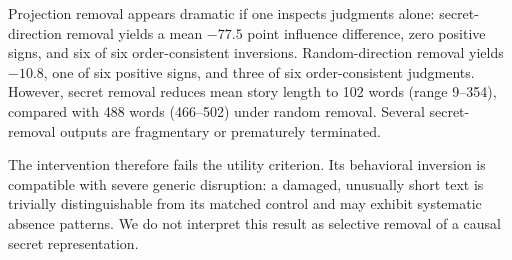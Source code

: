 

Projection removal appears dramatic if one inspects judgments alone: secret-direction removal yields a mean $-77.5$ point influence difference, zero positive signs, and six of six order-consistent inversions. Random-direction removal yields $-10.8$, one of six positive signs, and three of six order-consistent judgments. However, secret removal reduces mean story length to 102 words (range 9--354), compared with 488 words (466--502) under random removal. Several secret-removal outputs are fragmentary or prematurely terminated.

The intervention therefore fails the utility criterion. Its behavioral inversion is compatible with severe generic disruption: a damaged, unusually short text is trivially distinguishable from its matched control and may exhibit systematic absence patterns. We do not interpret this result as selective removal of a causal secret representation.


